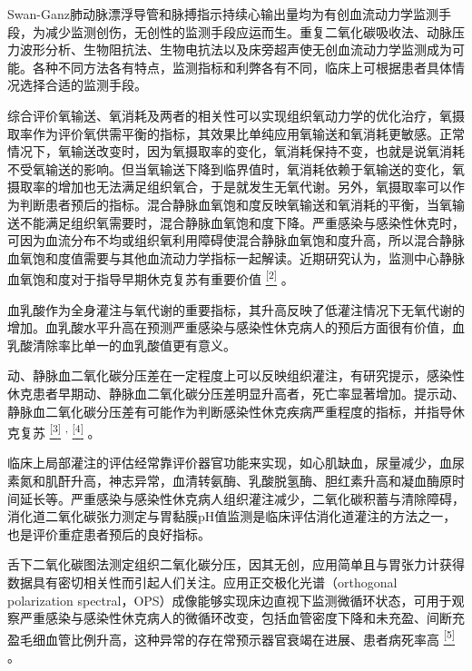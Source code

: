 Swan-Ganz肺动脉漂浮导管和脉搏指示持续心输出量均为有创血流动力学监测手段，为减少监测创伤，无创性的监测手段应运而生。重复二氧化碳吸收法、动脉压力波形分析、生物阻抗法、生物电抗法以及床旁超声使无创血流动力学监测成为可能。各种不同方法各有特点，监测指标和利弊各有不同，临床上可根据患者具体情况选择合适的监测手段。

综合评价氧输送、氧消耗及两者的相关性可以实现组织氧动力学的优化治疗，氧摄取率作为评价氧供需平衡的指标，其效果比单纯应用氧输送和氧消耗更敏感。正常情况下，氧输送改变时，因为氧摄取率的变化，氧消耗保持不变，也就是说氧消耗不受氧输送的影响。但当氧输送下降到临界值时，氧消耗依赖于氧输送的变化，氧摄取率的增加也无法满足组织氧合，于是就发生无氧代谢。另外，氧摄取率可以作为判断患者预后的指标。混合静脉血氧饱和度反映氧输送和氧消耗的平衡，当氧输送不能满足组织氧需要时，混合静脉血氧饱和度下降。严重感染与感染性休克时，可因为血流分布不均或组织氧利用障碍使混合静脉血氧饱和度升高，所以混合静脉血氧饱和度值需要与其他血流动力学指标一起解读。近期研究认为，监测中心静脉血氧饱和度对于指导早期休克复苏有重要价值
\protect\hyperlink{text00010.htmlux5cux23ch2-9}{\textsuperscript{{[}2{]}}}
。

血乳酸作为全身灌注与氧代谢的重要指标，其升高反映了低灌注情况下无氧代谢的增加。血乳酸水平升高在预测严重感染与感染性休克病人的预后方面很有价值，血乳酸清除率比单一的血乳酸值更有意义。

动、静脉血二氧化碳分压差在一定程度上可以反映组织灌注，有研究提示，感染性休克患者早期动、静脉血二氧化碳分压差明显升高者，死亡率显著增加。提示动、静脉血二氧化碳分压差有可能作为判断感染性休克疾病严重程度的指标，并指导休克复苏
\protect\hyperlink{text00010.htmlux5cux23ch3-9}{\textsuperscript{{[}3{]}}}
\textsuperscript{,}
\protect\hyperlink{text00010.htmlux5cux23ch4-9}{\textsuperscript{{[}4{]}}}
。

临床上局部灌注的评估经常靠评价器官功能来实现，如心肌缺血，尿量减少，血尿素氮和肌酐升高，神志异常，血清转氨酶、乳酸脱氢酶、胆红素升高和凝血酶原时间延长等。严重感染与感染性休克病人组织灌注减少，二氧化碳积蓄与清除障碍，消化道二氧化碳张力测定与胃黏膜pH值监测是临床评估消化道灌注的方法之一，也是评价重症患者预后的良好指标。

舌下二氧化碳图法测定组织二氧化碳分压，因其无创，应用简单且与胃张力计获得数据具有密切相关性而引起人们关注。应用正交极化光谱（orthogonal
polarization
spectral，OPS）成像能够实现床边直视下监测微循环状态，可用于观察严重感染与感染性休克病人的微循环改变，包括血管密度下降和未充盈、间断充盈毛细血管比例升高，这种异常的存在常预示器官衰竭在进展、患者病死率高
\protect\hyperlink{text00010.htmlux5cux23ch5-9}{\textsuperscript{{[}5{]}}}
。

